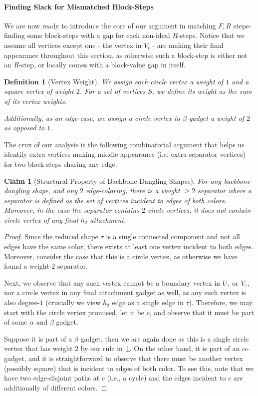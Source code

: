 \documentclass[12pt]{article}
\def \al {\alpha}
\newtheorem{claim}[theorem]{Claim}
\newtheorem{definition}[theorem]{Definition}
\begin{document}
\paragraph{Finding Slack for Mismatched Block-Steps}

We are now ready to introduce the core of our argument in matching $F,R$ steps- finding some block-steps with a gap for each non-ideal $R$-steps. Notice that we assume all vertices except one - the vertex in $V_t$ - are making their final appearance throughout this section, as otherwise such a block-step is either not an $R$-step, or locally comes with a block-value gap in itself. 


\begin{definition}[Vertex Weight]\label{def:vtx-wt} 
	We assign each circle vertex a weight of $1$ and a square vertex of weight $2$. For a set of vertices $S$, we define its weight as the sum of its vertex weights.
	
	Additionally, as an edge-case, we assign a circle vertex in $\beta$-gadget a weight of $2$ as opposed to $1$. 
\end{definition}

The crux of our analysis is the following combinatorial argument that helps us identify extra vertices making middle appearance (i.e. extra separator vertices) for two block-steps sharing any edge. 


\begin{claim}[Structural Property of Backbone Dangling Shapes] \label{clm: structural-clm}
	For any backbone dangling shape, and any $2$ edge-coloring, there is a weight $\geq 2$ separator where a separator is defined as the set of vertices incident to edges of both colors. Moreover, in the case the separator contains $2$ circle vertices, it does not contain circle vertex of any final $h_2$ attachment.
\end{claim}

\begin{proof}
	Since the reduced shape $\tau$ is a single connected component and not all edges have the same color, there exists at least one vertex incident to both edges. Moreover, consider the case that this is a circle vertex, as otherwise we have found a weight-$2$ separator.
	
	Next, we observe that any such vertex cannot be a boundary vertex in $U_\tau $ or $V_\tau $, nor a circle vertex in any final attachment gadget as well, as any such vertex is also degree-$1$ (crucially we view $h_2$ edge as a single edge in $\tau$). Therefore, we may start with the circle vertex promised, let it be $c$, and observe that it must be part of some $\al$ and $\beta$ gadget. 
	
	Suppose it is part of a $\beta$ gadget, then we are again done as this is a single circle vertex that has weight $2$ by our rule in~\cref{def:vtx-wt}. On the other hand, it is part of an $\al$-gadget, and it is straightforward to observe that there must be another vertex (possibly square) that is incident to edges of both color. To see this, note that we have two edge-disjoint paths at $c$ (i.e., a cycle) and the edges incident to $c$ are additionally of different colors.
 \end{proof}
 
\end{document}
